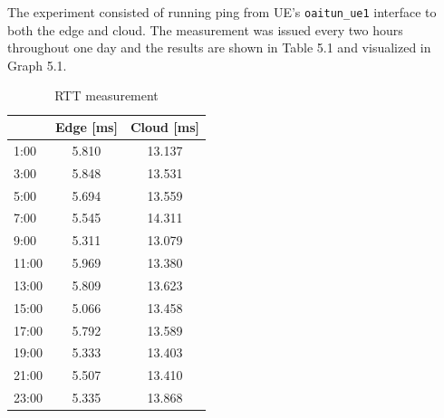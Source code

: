\documentclass[12pt,a4paper,twoside]{report}
\begin{document}
The experiment consisted of running ping from UE’s \verb|oaitun_ue1| interface to both the edge and cloud. The measurement was issued every two hours throughout one day and the results are shown in Table 5.1 and visualized in Graph 5.1. 
\begin{table}[!ht]
    \centering
	\caption{RTT measurement}
    \begin{tabular}{|l|c|c|}
    \hline
        & \textbf{Edge [ms]} & \textbf{Cloud [ms]} \\ \hline
        1:00 & 5.810 & 13.137 \\ \hline
        3:00 & 5.848 & 13.531 \\ \hline
        5:00 & 5.694 & 13.559 \\ \hline
        7:00 & 5.545 & 14.311 \\ \hline
        9:00 & 5.311 & 13.079 \\ \hline
        11:00 & 5.969 & 13.380 \\ \hline
        13:00 & 5.809 & 13.623 \\ \hline
        15:00 & 5.066 & 13.458 \\ \hline
        17:00 & 5.792 & 13.589 \\ \hline
        19:00 & 5.333 & 13.403 \\ \hline
        21:00 & 5.507 & 13.410 \\ \hline
        23:00 & 5.335 & 13.868 \\ \hline
    \end{tabular}
\end{table}
\end{document}
